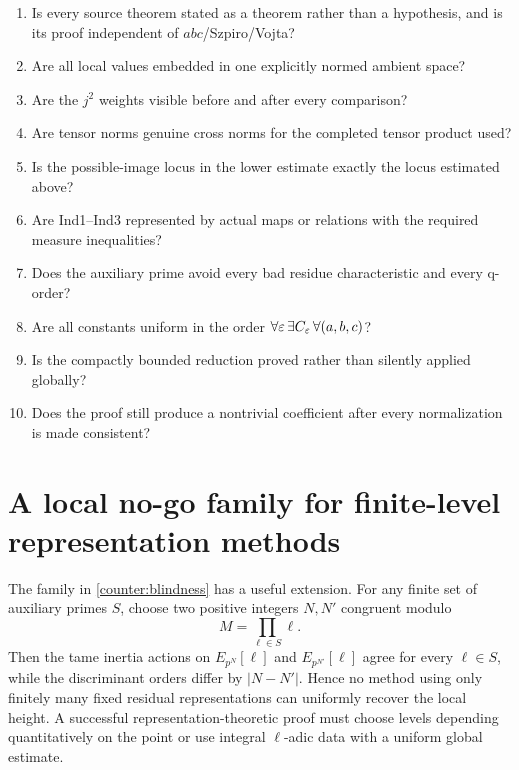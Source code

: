 \begin{enumerate}[label=\textbf{A\arabic*.},leftmargin=3.4em]
\item Is every source theorem stated as a theorem rather than a hypothesis, and is its proof independent of $abc$/Szpiro/Vojta?
\item Are all local values embedded in one explicitly normed ambient space?
\item Are the $j^2$ weights visible before and after every comparison?
\item Are tensor norms genuine cross norms for the completed tensor product used?
\item Is the possible-image locus in the lower estimate exactly the locus estimated above?
\item Are Ind1--Ind3 represented by actual maps or relations with the required measure inequalities?
\item Does the auxiliary prime avoid every bad residue characteristic and every q-order?
\item Are all constants uniform in the order $\forall\varepsilon\,\exists C_\varepsilon\,\forall(a,b,c)$?
\item Is the compactly bounded reduction proved rather than silently applied globally?
\item Does the proof still produce a nontrivial coefficient after every normalization is made consistent?
\end{enumerate}

\section{A local no-go family for finite-level representation methods}

The family in \cref{counter:blindness} has a useful extension.  For any finite set of auxiliary primes $S$, choose two positive integers $N,N'$ congruent modulo
\[
 M=\prod_{\ell\in S}\ell.
\]
Then the tame inertia actions on $E_{p^N}[\ell]$ and $E_{p^{N'}}[\ell]$ agree for every $\ell\in S$, while the discriminant orders differ by $|N-N'|$.  Hence no method using only finitely many fixed residual representations can uniformly recover the local height.  A successful representation-theoretic proof must choose levels depending quantitatively on the point or use integral $\ell$-adic data with a uniform global estimate.

